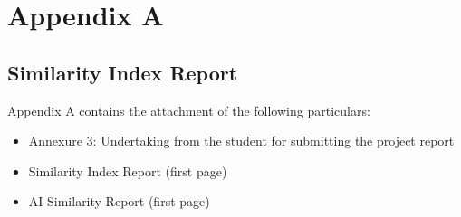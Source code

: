 \chapter*{Appendix A}
\section*{Similarity Index Report}

Appendix A contains the attachment of the following particulars:
\begin{itemize}
	\item Annexure 3: Undertaking from the student for submitting the project report
	\item Similarity Index Report (first page)
    \item AI Similarity Report (first page)
\end{itemize}

\thispagestyle{plain}